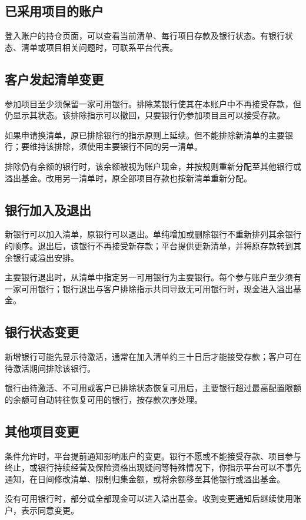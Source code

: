 \documentclass[UTF8,fontset=none,11pt,a4paper]{ctexart}
\begin{document}
\subsection*{已采用项目的账户}
登入账户的持仓页面，可以查看当前清单、每行项目存款及银行状态。有银行状态、清单或项目相关问题时，可联系平台代表。


\subsection*{客户发起清单变更}
参加项目至少须保留一家可用银行。排除某银行使其在本账户中不再接受存款，但仍显示其状态。该排除指示可以撤回，只要银行仍参加项目且可以接受存款。


如果申请换清单，原已排除银行的指示原则上延续。但不能排除新清单的主要银行；要维持该排除，须使用主要银行不同的另一清单。


排除仍有余额的银行时，该余额被视为账户现金，并按规则重新分配至其他银行或溢出基金。改用另一清单时，原全部项目存款也按新清单重新分配。


\subsection*{银行加入及退出}
新银行可以加入清单，原银行可以退出。单纯增加或删除银行不重新排列其余银行的顺序。退出后，该银行不再接受新存款；平台提供更新清单，并将原存款转到其余银行或溢出安排。


主要银行退出时，从清单中指定另一可用银行为主要银行。每个参与账户至少须有一家可用银行；银行退出与客户排除指示共同导致无可用银行时，现金进入溢出基金。


\subsection*{银行状态变更}
新增银行可能先显示待激活，通常在加入清单约三十日后才能接受存款；客户可在待激活期间排除该银行。


银行由待激活、不可用或客户已排除状态恢复可用后，主要银行超过最高配置限额的余额可自动转往恢复可用的银行，按存款次序处理。


\subsection*{其他项目变更}
条件允许时，平台提前通知影响账户的变更。银行不愿或不能接受存款、项目参与终止，或银行持续经营及保险资格出现疑问等特殊情况下，你指示平台可以不事先通知，在日间修改清单、限制归集金额，或将余额移至其他银行或溢出基金。


没有可用银行时，部分或全部现金可以进入溢出基金。收到变更通知后继续使用账户，表示同意变更。
\end{document}
